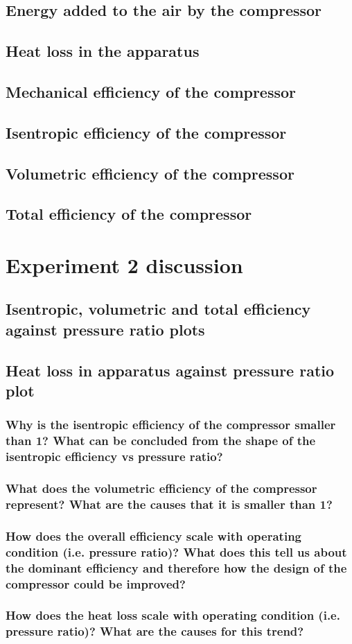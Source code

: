 \documentclass[class=article, crop=false, 12pt,a4paper]{standalone}
\begin{document}
\subsection{Energy added to the air by the compressor}
\subsection{Heat loss in the apparatus}
\subsection{Mechanical efficiency of the compressor}
\subsection{Isentropic efficiency of the compressor}
\subsection{Volumetric efficiency of the compressor}
\subsection{Total efficiency of the compressor}
\section{Experiment 2 discussion}
\subsection{Isentropic, volumetric and total efficiency against pressure ratio plots}
\subsection{Heat loss in apparatus against pressure ratio plot}
\subsubsection{Why is the isentropic efficiency of the compressor smaller than 1? What can be concluded from the shape of the isentropic efficiency vs pressure ratio?}
\subsubsection{What does the volumetric efficiency of the compressor represent? What are the causes that it is smaller than 1?}
\subsubsection{How does the overall efficiency scale with operating condition (i.e. pressure ratio)? What does this tell us about the dominant efficiency and therefore how the design of the compressor could be improved?} 
\subsubsection{How does the heat loss scale with operating condition (i.e. pressure ratio)? What are the causes for this trend?}


\listoffigures
\end{document}
